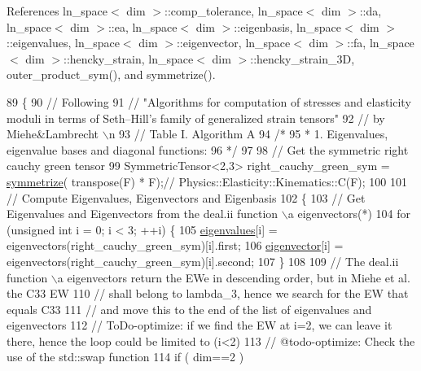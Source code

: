 References ln\+\_\+space$<$ dim $>$\+::comp\+\_\+tolerance, ln\+\_\+space$<$ dim $>$\+::da, ln\+\_\+space$<$ dim $>$\+::ea, ln\+\_\+space$<$ dim $>$\+::eigenbasis, ln\+\_\+space$<$ dim $>$\+::eigenvalues, ln\+\_\+space$<$ dim $>$\+::eigenvector, ln\+\_\+space$<$ dim $>$\+::fa, ln\+\_\+space$<$ dim $>$\+::hencky\+\_\+strain, ln\+\_\+space$<$ dim $>$\+::hencky\+\_\+strain\+\_\+3D, outer\+\_\+product\+\_\+sym(), and symmetrize().


\begin{DoxyCode}
89 \{
90     \textcolor{comment}{// Following}
91     \textcolor{comment}{// "Algorithms for computation of stresses and elasticity moduli in terms of Seth–Hill’s family of
       generalized strain tensors"}
92     \textcolor{comment}{// by Miehe&Lambrecht \(\backslash\)n}
93     \textcolor{comment}{// Table I. Algorithm A}
94     \textcolor{comment}{/*}
95 \textcolor{comment}{     * 1. Eigenvalues, eigenvalue bases and diagonal functions:}
96 \textcolor{comment}{     */}
97 
98     \textcolor{comment}{// Get the symmetric right cauchy green tensor}
99      SymmetricTensor<2,3> right\_cauchy\_green\_sym = \hyperlink{functions_8h_afe83e9509497294b7f662b800b6b91ff}{symmetrize}( transpose(F) * F);\textcolor{comment}{//
      Physics::Elasticity::Kinematics::C(F);}
100 
101     \textcolor{comment}{// Compute Eigenvalues, Eigenvectors and Eigenbasis}
102      \{
103         \textcolor{comment}{// Get Eigenvalues and Eigenvectors from the deal.ii function \(\backslash\)a eigenvectors(*)}
104         \textcolor{keywordflow}{for} (\textcolor{keywordtype}{unsigned} \textcolor{keywordtype}{int} i = 0; i < 3; ++i) \{
105             \hyperlink{classln__space_aad33c1f308694e2801bbea7730d3b9c6}{eigenvalues}[i] = eigenvectors(right\_cauchy\_green\_sym)[i].first;
106             \hyperlink{classln__space_ada3f56f8a97f974275c267ac172a0b40}{eigenvector}[i] = eigenvectors(right\_cauchy\_green\_sym)[i].second;
107         \}
108 
109         \textcolor{comment}{// The deal.ii function \(\backslash\)a eigenvectors return the EWe in descending order, but in Miehe et al. the
       C33 EW}
110         \textcolor{comment}{// shall belong to lambda\_3, hence we search for the EW that equals C33}
111         \textcolor{comment}{// and move this to the end of the list of eigenvalues and eigenvectors}
112          \textcolor{comment}{// ToDo-optimize: if we find the EW at i=2, we can leave it there, hence the loop could be limited
       to (i<2)}
113         \textcolor{comment}{// @todo-optimize: Check the use of the std::swap function}
114         \textcolor{keywordflow}{if} ( dim==2 )

\end{DoxyCode}
